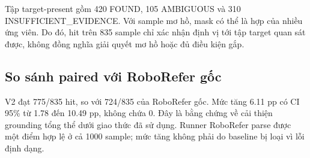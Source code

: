 {\setlength{\emergencystretch}{3em}
Tập target-present gồm 420 FOUND, 105 AMBIGUOUS và 310
INSUFFICIENT\_\allowbreak EVIDENCE. Với sample mơ hồ, mask có thể là hợp
của nhiều ứng viên. Do đó, hit trên 835 sample chỉ xác nhận
định vị tới tập target quan sát được, không đồng nghĩa giải
quyết mơ hồ hoặc đủ điều kiện gắp.\par}


\subsection{So sánh paired với RoboRefer gốc}

V2 đạt 775/835 hit, so với 724/835 của RoboRefer gốc.
Mức tăng 6.11 pp có CI 95\% từ 1.78 đến 10.49 pp,
không chứa 0. Đây là bằng chứng về cải thiện grounding
tổng thể dưới giao thức đã sử dụng. Runner RoboRefer
parse được một điểm hợp lệ ở cả 1000 sample; mức tăng
không phải do baseline bị loại vì lỗi định dạng.


